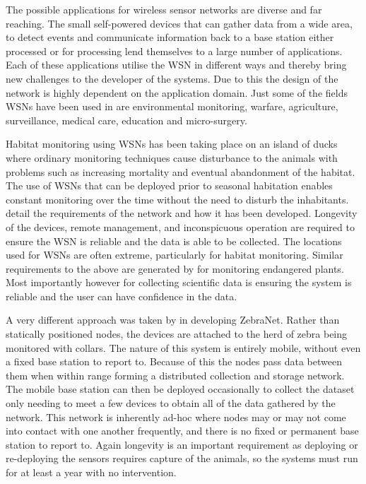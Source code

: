 \documentclass[authoryearcitations]{UoYCSproject}
\begin{document}

The possible applications for wireless sensor networks are diverse and far reaching. The small self-powered devices that can gather data from a wide area, to detect events and communicate information back to a base station either processed or for processing lend themselves to a large number of applications. Each of these applications utilise the WSN in different ways and thereby bring new challenges to the developer of the systems. Due to this the design of the network is highly dependent on the application domain. Just some of the fields WSNs have been used in are environmental monitoring, warfare, agriculture, surveillance, medical care, education and micro-surgery.

Habitat monitoring using WSNs has been taking place on an island of ducks where ordinary monitoring techniques cause disturbance to the animals with problems such as increasing mortality and eventual abandonment of the habitat. The use of WSNs that can be deployed prior to seasonal habitation enables constant monitoring over the time without the need to disturb the inhabitants. \citet{Mainwaring2002} detail the requirements of the network and how it has been developed. Longevity of the devices, remote management, and inconspicuous operation are required to ensure the WSN is reliable and the data is able to be collected. The locations used for WSNs are often extreme, particularly for habitat monitoring. Similar requirements to the above are generated by \citet{Biagioni2002} for monitoring endangered plants. Most importantly however for collecting scientific data is ensuring the system is reliable and the user can have confidence in the data.


A very different approach was taken by \citet{Juang2002} in developing ZebraNet. Rather than statically positioned nodes, the devices are attached to the herd of zebra being monitored with collars. The nature of this system is entirely mobile, without even a fixed base station to report to. Because of this the nodes pass data between them when within range forming a distributed collection and storage network. The mobile base station can then be deployed occasionally to collect the dataset only needing to meet a few devices to obtain all of the data gathered by the network. This network is inherently ad-hoc where nodes may or may not come into contact with one another frequently, and there is no fixed or permanent base station to report to. Again longevity is an important requirement as deploying or re-deploying the sensors requires capture of the animals, so the systems must run for at least a year with no intervention.
\end{document}
